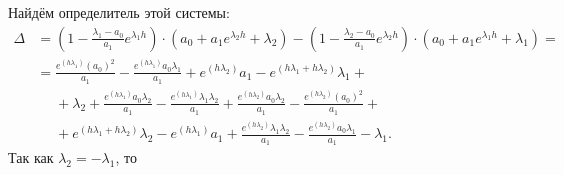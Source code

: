 \documentclass[a4paper,14pt]{article}
\theoremstyle{definition}
\begin{document}
Найдём определитель этой системы:
\[
  \begin{aligned}
    \Delta
    &=
      \left( 1 - \frac{\lambda_1 - a_0}{a_1} e^{\lambda_1 h} \right)
      \cdot
      \left(
      a_0 + a_1 e^{\lambda_2 h} + \lambda_2
      \right)
      -
      \left( 1 - \frac{\lambda_2 - a_0}{a_1} e^{\lambda_2 h} \right)
      \cdot
      \left(
      a_0 + a_1 e^{\lambda_1 h} + \lambda_1
      \right) = \\
    &=
    \frac{e^{(h \lambda_1)} (a_0)^2}{a_1}
    - \frac{e^{(h \lambda_1)} a_0 \lambda_1}{a_1}
    + e^{(h \lambda_2)} a_1 - e^{(h \lambda_1 + h \lambda_2)} \lambda_1 + \\
    &\phantom{=}
    + \lambda_2 + \frac{e^{(h \lambda_1)} a_0 \lambda_2}{a_1}
    - \frac{e^{(h \lambda_1)} \lambda_1 \lambda_2}{a_1}
    + \frac{e^{(h \lambda_2)} a_0 \lambda_2}{a_1}
    - \frac{e^{(h \lambda_2)} (a_0)^2}{a_1} + \\
    &\phantom{=}
    + e^{(h \lambda_1 + h \lambda_2)} \lambda_2 - e^{(h \lambda_1)} a_1
    + \frac{e^{(h \lambda_2)} \lambda_1 \lambda_2}{a_1}
    - \frac{e^{(h \lambda_2)} a_0 \lambda_1}{a_1} - \lambda_1.
  \end{aligned}
\]
Так как $\lambda_2 = - \lambda_1$, то
\end{document}
